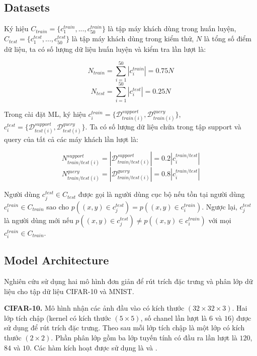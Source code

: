\documentclass[runningheads]{llncs}
\begin{document}
\subsection{Datasets}

Ký hiệu $C_{train} = \{c^{train}_1,...,c^{train}_{50}\}$ là tập máy khách dùng trong huấn luyện, $C_{test} = \{c^{test}_1,...,c^{test}_{50}\}$ là tập máy khách dùng trong kiểm thử, $N$ là tổng số điểm dữ liệu, ta có số lượng dữ liệu huấn luyện và kiểm tra lần lượt là:

\begin{equation*}
    N_{train} = \sum_{i=1}^{50} \left|c^{train}_i\right| = 0.75N
\end{equation*}
\begin{equation*}
    N_{test} = \sum_{i=1}^{50} \left|c^{test}_i\right| = 0.25N
\end{equation*}

Trong cài đặt ML, ký hiệu $c^{train}_i = \{\mathcal{D}_{train(i)}^{support}, \mathcal{D}_{train(i)}^{query}\}$, $ c^{test}_i = \{\mathcal{D}_{test(i)}^{support}, \mathcal{D}_{test(i)}^{query}\}$. Ta có số lượng dữ liệu chứa trong tập support và query của tất cả các máy khách lần lượt là:

\begin{equation*}
    N_{train/test(i)}^{support} = \left|\mathcal{D}_{train/test(i)}^{support}\right| = 0.2 \left|c_i^{train/test}\right|
\end{equation*}
\begin{equation*}
    N_{train/test(i)}^{query} = \left|\mathcal{D}_{train/test(i)}^{query}\right| = 0.8 \left|c^{train/test}_i\right|
\end{equation*}

Người dùng $c_j^{test} \in C_{test}$ được gọi là người dùng cục bộ nếu tồn tại người dùng $c_i^{train}\in C_{train}$ sao cho $p\left((x,y)\in c_j^{test}\right) = p\left((x,y)\in c_i^{train}\right)$. Ngược lại, $c_j^{test}$ là người dùng mới nếu $p\left((x,y)\in c_j^{test}\right) \ne p\left((x,y)\in c_i^{train}\right)$ với mọi $c_i^{train}\in C_{train}$.

\subsection{Model Architecture}
\label{model_architecture}

Nghiên cứu sử dụng hai mô hình đơn giản để rút trích đặc trưng và phân lớp dữ liệu cho tập dữ liệu CIFAR-10 và MNIST.

\textbf{CIFAR-10.} Mô hình nhận các ảnh đầu vào có kích thước $(32\times32\times3)$. Hai lớp tích chập (kernel có kích thước $(5\times5)$, số chanel lần lượt là $6$ và $16$) được sử dụng để rút trích đặc trưng. Theo sau mỗi lớp tích chập là một lớp  có kích thước $(2\times2)$. Phần phân lớp gồm ba lớp tuyến tính có đầu ra lần lượt là $120$, $84$ và $10$. Các hàm kích hoạt được sử dụng là  và .
\end{document}
